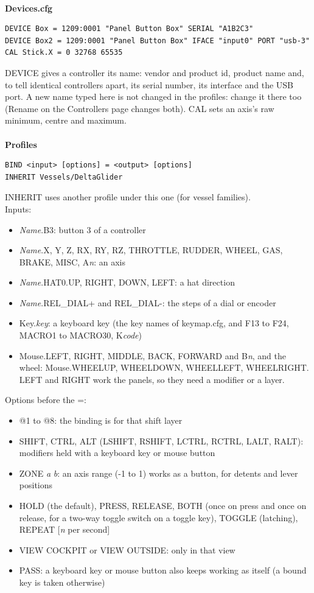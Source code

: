 \documentclass[Orbiter User Manual.tex]{subfiles}
\begin{document}
\\
\textbf{Devices.cfg}
\begin{lstlisting}[language=OSFS]
DEVICE Box = 1209:0001 "Panel Button Box" SERIAL "A1B2C3"
DEVICE Box2 = 1209:0001 "Panel Button Box" IFACE "input0" PORT "usb-3"
CAL Stick.X = 0 32768 65535
\end{lstlisting}
DEVICE gives a controller its name: vendor and product id, product name and, to tell identical controllers apart, its serial number, its interface and the USB port. A new name typed here is not changed in the profiles: change it there too (Rename on the Controllers page changes both). CAL sets an axis's raw minimum, centre and maximum.\\
\\
\textbf{Profiles}
\begin{lstlisting}[language=OSFS]
BIND <input> [options] = <output> [options]
INHERIT Vessels/DeltaGlider
\end{lstlisting}
INHERIT uses another profile under this one (for vessel families).\\
Inputs:
\begin{itemize}
\item \textit{Name}.B3: button 3 of a controller
\item \textit{Name}.X, Y, Z, RX, RY, RZ, THROTTLE, RUDDER, WHEEL, GAS, BRAKE, MISC, A\textit{n}: an axis
\item \textit{Name}.HAT0.UP, RIGHT, DOWN, LEFT: a hat direction
\item \textit{Name}.REL\_DIAL+ and REL\_DIAL-: the steps of a dial or encoder
\item Key.\textit{key}: a keyboard key (the key names of keymap.cfg, and F13 to F24, MACRO1 to MACRO30, K\textit{code})
\item Mouse.LEFT, RIGHT, MIDDLE, BACK, FORWARD and B\textit{n}, and the wheel: Mouse.WHEELUP, WHEELDOWN, WHEELLEFT, WHEELRIGHT. LEFT and RIGHT work the panels, so they need a modifier or a layer.
\end{itemize}
Options before the =:
\begin{itemize}
\item @1 to @8: the binding is for that shift layer
\item SHIFT, CTRL, ALT (LSHIFT, RSHIFT, LCTRL, RCTRL, LALT, RALT): modifiers held with a keyboard key or mouse button
\item ZONE \textit{a} \textit{b}: an axis range (-1 to 1) works as a button, for detents and lever positions
\item HOLD (the default), PRESS, RELEASE, BOTH (once on press and once on release, for a two-way toggle switch on a toggle key), TOGGLE (latching), REPEAT [\textit{n} per second]
\item VIEW COCKPIT or VIEW OUTSIDE: only in that view
\item PASS: a keyboard key or mouse button also keeps working as itself (a bound key is taken otherwise)
\end{itemize}
\end{document}
